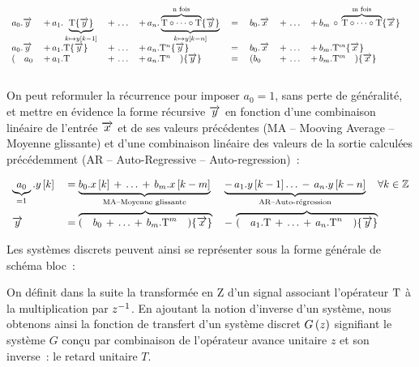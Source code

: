 \begin{equation}
  \begin{array}{llllllll}
  a_0.\y{} \,&+\, a_1.\caCest{{\oret}\OperDe{\y}}{k\mapsto y\b{k-1}} \,&+\,\dots \,&+\,a_n.\caCest{\overbrace{\oret\circ\dots\circ \oret}^{\text{n fois}}\OperDe{\y}}{k\mapsto y\b{k-n}}\;&= \quad b_0.\x{} \,&+\, \dots \,&+\, b_m\,\circ\,\overbrace{\oret\circ\dots\circ \oret}^{\text{m fois}}\OperDe{\x}  & \nonumber \\
a_0.\y{} \,&+\, {a_1.\oret}\OperDe{\y} \,&+\, \dots \,&+\, a_n.\oret^n\OperDe{\y}   &= \quad  b_0.\x{} \,&+\, \dots \,&+\,{b_m.\oret^m}\OperDe{\x} \nonumber \\
  (\quad a_0 \,&+\, {a_1.\oret} \,&+\,\dots \,&+\, a_n.\oret^n \quad)\OperDe{\y} &=\quad (b_0 \,&+\, \dots \,&+\,  {b_m.\oret^m} \quad ) \OperDe{\x} \nonumber \\ &&&&&&&
  \end{array}
\end{equation}

On peut  reformuler la récurrence pour imposer $a_0=1$, sans perte de
généralité, et mettre en évidence la forme récursive $\overrightarrow{y}$ en fonction
d'une combinaison linéaire de l'entrée $\overrightarrow{x}$ et de ses valeurs précédentes (MA --
Mooving Average -- Moyenne glissante) et d'une combinaison linéaire
des valeurs de la sortie calculées précédemment (AR -- Auto-Regressive --
Auto-regression)~:

\begin{equation}
  \begin{array}{lll}
\underbrace{a_0}_{=1}.y\left[k\right] \;&= \underbrace{ b_0.x\left[k\right] \,+\, \dots \,+\, b_m.x\left[k-m\right]}_{\text{MA--Moyenne glissante}} \;& \underbrace{-\,  a_1.y\left[k-1\right]  \dots  \,-\, a_n.y\left[k-n\right]}_{\text{AR--Auto-régression}}   \quad \forall k\in\mathbb{Z} \nonumber\\
\overrightarrow{y}{} \;&= \overbrace{(\quad b_0 \,+\, \dots \,+\, {b_m.\mathrm{T}^m} \quad )\!\left\{\overrightarrow{x}\right\}}^{} \,&-\, \overbrace{(\quad{a_1.\mathrm{T}} \,+\, \dots \,+\, a_n.\mathrm{T}^n\quad)\!\left\{\overrightarrow{y}\right\}}^{}   \nonumber \\ 
  \end{array}
\end{equation}

Les systèmes discrets peuvent ainsi se représenter sous la forme générale de schéma bloc~:



On définit dans la suite la transformée en Z d'un signal associant
l'opérateur $\mathrm{T}$ à la multiplication par $z^{-1}$.  En ajoutant la
notion d'inverse d'un système, nous obtenons ainsi la fonction de
transfert d'un système discret $G\left(z\right)$ signifiant le système $G$
conçu par combinaison de l'opérateur avance unitaire $z$ et son
inverse~: le retard unitaire $T$.


